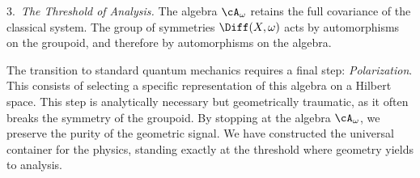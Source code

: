 \begin{article}
    3.~\emph{The Threshold of Analysis.}
    The algebra $\cA_\omega$ retains the full covariance of the classical system.
    The group of symmetries $\Diff(X, \omega)$ acts by automorphisms on the groupoid,
    and therefore by automorphisms on the algebra.
    
    The transition to standard quantum mechanics requires a final step:
    \emph{Polarization}.
    This consists of selecting a specific representation of this algebra on a Hilbert space.
    This step is analytically necessary but geometrically traumatic,
    as it often breaks the symmetry of the groupoid.
    By stopping at the algebra $\cA_\omega$,
    we preserve the purity of the geometric signal.
    We have constructed the universal container for the physics,
    standing exactly at the threshold where geometry yields to analysis.
  \end{article}
  
  
